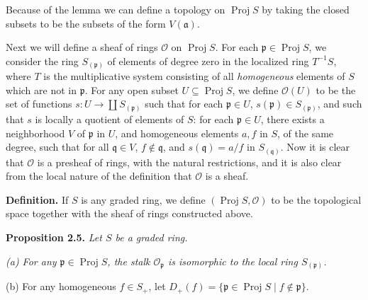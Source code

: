 {\medskip
Because of the lemma we can define a topology on $\operatorname{Proj}S$ by taking the closed subsets to be the subsets of the form $V(\mathfrak a)$.

Next we will define a sheaf of rings $\mathcal O$ on $\operatorname{Proj}S$. For each $\mathfrak p\in\operatorname{Proj}S$, we consider the ring $S_{(\mathfrak p)}$ of elements of degree zero in the localized ring $T^{-1}S$, where $T$ is the multiplicative system consisting of all \emph{homogeneous} elements of $S$ which are not in $\mathfrak p$. For any open subset $U\subseteq\operatorname{Proj}S$, we define $\mathcal O(U)$ to be the set of functions $s\colon U\to\coprod S_{(\mathfrak p)}$ such that for each $\mathfrak p\in U$, $s(\mathfrak p)\in S_{(\mathfrak p)}$, and such that $s$ is locally a quotient of elements of $S$: for each $\mathfrak p\in U$, there exists a neighborhood $V$ of $\mathfrak p$ in $U$, and homogeneous elements $a,f$ in $S$, of the same degree, such that for all $\mathfrak q\in V$, $f\notin\mathfrak q$, and $s(\mathfrak q)=a/f$ in $S_{(\mathfrak q)}$. Now it is clear that $\mathcal O$ is a presheaf of rings, with the natural restrictions, and it is also clear from the local nature of the definition that $\mathcal O$ is a sheaf.

\medskip
\noindent\textbf{Definition.} If $S$ is any graded ring, we define $(\operatorname{Proj}S,\mathcal O)$ to be the topological space together with the sheaf of rings constructed above.

\medskip
\noindent\hypertarget{result-II-2.5}{}\textbf{Proposition 2.5.} \emph{Let $S$ be a graded ring.}
\par{\leftskip=12pt\itshape
\hypertarget{result-II-2.5a}{}(a) For any $\mathfrak p\in\operatorname{Proj}S$, the stalk $\mathcal O_{\mathfrak p}$ is isomorphic to the local ring $S_{(\mathfrak p)}$.

\hypertarget{result-II-2.5b}{}(b) For any homogeneous $f\in S_+$, let $D_+(f)=\{\mathfrak p\in\operatorname{Proj}S\mid f\notin\mathfrak p\}$.\par}
}
